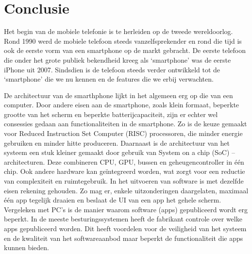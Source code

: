 ﻿\chapter{Conclusie}

Het begin van de mobiele telefonie is te herleiden op de tweede wereldoorlog. Rond 1990 werd de mobiele telefoon steeds vanzelfsprekender en rond die tijd is ook de eerste vorm van een smartphone op de markt gebracht. De eerste telefoon die onder het grote publiek bekendheid kreeg als `smartphone' was de eerste iPhone uit 2007. Sindsdien is de telefoon steeds verder ontwikkeld tot de `smartphone' die we nu kennen en de features die we erbij verwachten.

De architectuur van de smarthphone lijkt in het algemeen erg op die van een computer. Door andere eisen aan de smartphone, zoals klein formaat, beperkte grootte van het scherm en beperkte batterijcapaciteit, zijn er echter wel consessies gedaan aan functionaliteiten in de smartphone. Zo is de keuze gemaakt voor Reduced Instruction Set Computer (RISC) processoren, die minder energie gebruiken en minder hitte produceren. Daarnaast is de architectuur van het systeem een stuk kleiner gemaakt door gebruik van System on a chip (SoC) –architecturen. Deze combineren CPU, GPU, bussen en geheugencontroller in één chip. Ook andere hardware kan geïntegreerd worden, wat zorgt voor een reductie van complexiteit en ruimtegebruik. In het uitvoeren van software is met dezelfde eisen rekening gehouden. Zo mag er, enkele uitzonderingen daargelaten, maximaal \'e\'en app tegelijk draaien en beslaat de UI van een app het gehele scherm. Vergeleken met PC's is de manier waarom software (apps) gepubliceerd wordt erg beperkt. In de meeste besturingssystemen heeft de fabrikant controle over welke apps gepubliceerd worden. Dit heeft voordelen voor de veiligheid van het systeem en de kwaliteit van het softwareaanbod maar beperkt de functionaliteit die apps kunnen bieden.

